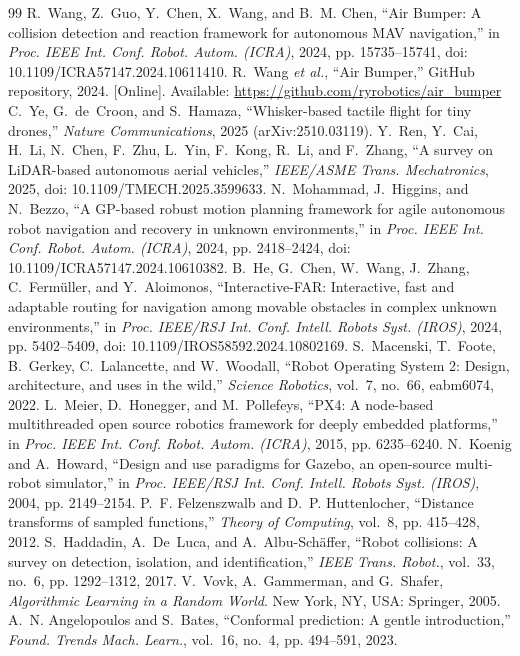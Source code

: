 \documentclass[conference,10pt]{IEEEtran}
\begin{document}
\FloatBarrier
\begin{thebibliography}{99}
\footnotesize
{} R.~Wang, Z.~Guo, Y.~Chen, X.~Wang, and B.~M. Chen, ``Air Bumper: A collision detection and reaction framework for autonomous MAV navigation,'' in \emph{Proc. IEEE Int. Conf. Robot. Autom. (ICRA)}, 2024, pp. 15735--15741, doi: 10.1109/ICRA57147.2024.10611410.
 R.~Wang \emph{et al.}, ``Air Bumper,'' GitHub repository, 2024. [Online]. Available: \url{https://github.com/ryrobotics/air_bumper}
 C.~Ye, G.~de~Croon, and S.~Hamaza, ``Whisker-based tactile flight for tiny drones,'' \emph{Nature Communications}, 2025 (arXiv:2510.03119).
 Y.~Ren, Y.~Cai, H.~Li, N.~Chen, F.~Zhu, L.~Yin, F.~Kong, R.~Li, and F.~Zhang, ``A survey on LiDAR-based autonomous aerial vehicles,'' \emph{IEEE/ASME Trans. Mechatronics}, 2025, doi: 10.1109/TMECH.2025.3599633.
 N.~Mohammad, J.~Higgins, and N.~Bezzo, ``A GP-based robust motion planning framework for agile autonomous robot navigation and recovery in unknown environments,'' in \emph{Proc. IEEE Int. Conf. Robot. Autom. (ICRA)}, 2024, pp. 2418--2424, doi: 10.1109/ICRA57147.2024.10610382.
 B.~He, G.~Chen, W.~Wang, J.~Zhang, C.~Fermüller, and Y.~Aloimonos, ``Interactive-FAR: Interactive, fast and adaptable routing for navigation among movable obstacles in complex unknown environments,'' in \emph{Proc. IEEE/RSJ Int. Conf. Intell. Robots Syst. (IROS)}, 2024, pp. 5402--5409, doi: 10.1109/IROS58592.2024.10802169.
 S.~Macenski, T.~Foote, B.~Gerkey, C.~Lalancette, and W.~Woodall, ``Robot Operating System 2: Design, architecture, and uses in the wild,'' \emph{Science Robotics}, vol.~7, no.~66, eabm6074, 2022.
 L.~Meier, D.~Honegger, and M.~Pollefeys, ``PX4: A node-based multithreaded open source robotics framework for deeply embedded platforms,'' in \emph{Proc. IEEE Int. Conf. Robot. Autom. (ICRA)}, 2015, pp. 6235--6240.
 N.~Koenig and A.~Howard, ``Design and use paradigms for Gazebo, an open-source multi-robot simulator,'' in \emph{Proc. IEEE/RSJ Int. Conf. Intell. Robots Syst. (IROS)}, 2004, pp. 2149--2154.
 P.~F. Felzenszwalb and D.~P. Huttenlocher, ``Distance transforms of sampled functions,'' \emph{Theory of Computing}, vol.~8, pp. 415--428, 2012.
 S.~Haddadin, A.~De~Luca, and A.~Albu-Schäffer, ``Robot collisions: A survey on detection, isolation, and identification,'' \emph{IEEE Trans. Robot.}, vol.~33, no.~6, pp. 1292--1312, 2017.
 V.~Vovk, A.~Gammerman, and G.~Shafer, \emph{Algorithmic Learning in a Random World}. New York, NY, USA: Springer, 2005.
 A.~N. Angelopoulos and S.~Bates, ``Conformal prediction: A gentle introduction,'' \emph{Found. Trends Mach. Learn.}, vol.~16, no.~4, pp. 494--591, 2023.
\end{thebibliography}
\end{document}
